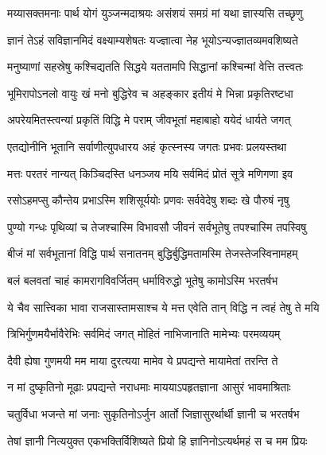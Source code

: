 \twolineshloka
{मय्यासक्तमनाः पार्थ योगं युञ्जन्मदाश्रयः}
{असंशयं समग्रं मां यथा ज्ञास्यसि तच्छृणु}%

\twolineshloka
{ज्ञानं तेऽहं सविज्ञानमिदं वक्ष्याम्यशेषतः}
{यज्ज्ञात्वा नेह भूयोऽन्यज्ज्ञातव्यमवशिष्यते}%

\twolineshloka
{मनुष्याणां सहस्रेषु कश्चिद्यतति सिद्धये}
{यततामपि सिद्धानां कश्चिन्मां वेत्ति तत्त्वतः}%

\twolineshloka
{भूमिरापोऽनलो वायुः खं मनो बुद्धिरेव च}
{अहङ्कार इतीयं मे भिन्ना प्रकृतिरष्टधा}%

\twolineshloka
{अपरेयमितस्त्वन्यां प्रकृतिं विद्धि मे पराम्}
{जीवभूतां महाबाहो ययेदं धार्यते जगत्}%

\twolineshloka
{एतद्योनीनि भूतानि सर्वाणीत्युपधारय}
{अहं कृत्स्नस्य जगतः प्रभवः प्रलयस्तथा}%

\twolineshloka
{मत्तः परतरं नान्यत् किञ्चिदस्ति धनञ्जय}
{मयि सर्वमिदं प्रोतं सूत्रे मणिगणा इव}%

\twolineshloka
{रसोऽहमप्सु कौन्तेय प्रभाऽस्मि शशिसूर्ययोः}
{प्रणवः सर्ववेदेषु शब्दः खे पौरुषं नृषु}%

\twolineshloka
{पुण्यो गन्धः पृथिव्यां च तेजश्चास्मि विभावसौ}
{जीवनं सर्वभूतेषु तपश्चास्मि तपस्विषु}%

\twolineshloka
{बीजं मां सर्वभूतानां विद्धि पार्थ सनातनम्}
{बुद्धिर्बुद्धिमतामस्मि तेजस्तेजस्विनामहम्}%

\twolineshloka
{बलं बलवतां चाहं कामरागविवर्जितम्}
{धर्माविरुद्धो भूतेषु कामोऽस्मि भरतर्षभ}%

\twolineshloka
{ये चैव सात्त्विका भावा राजसास्तामसाश्च ये}
{मत्त एवेति तान् विद्धि न त्वहं तेषु ते मयि}%

\twolineshloka
{त्रिभिर्गुणमयैर्भावैरेभिः सर्वमिदं जगत्}
{मोहितं नाभिजानाति मामेभ्यः परमव्ययम्}%

\twolineshloka
{दैवी ह्येषा गुणमयी मम माया दुरत्यया}
{मामेव ये प्रपद्यन्ते मायामेतां तरन्ति ते}%

\twolineshloka
{न मां दुष्कृतिनो मूढाः प्रपद्यन्ते नराधमाः}
{माययाऽपहृतज्ञाना आसुरं भावमाश्रिताः}%

\twolineshloka
{चतुर्विधा भजन्ते मां जनाः सुकृतिनोऽर्जुन}
{आर्तो जिज्ञासुरर्थार्थी ज्ञानी च भरतर्षभ}%

\twolineshloka
{तेषां ज्ञानी नित्ययुक्त एकभक्तिर्विशिष्यते}
{प्रियो हि ज्ञानिनोऽत्यर्थमहं स च मम प्रियः}%

